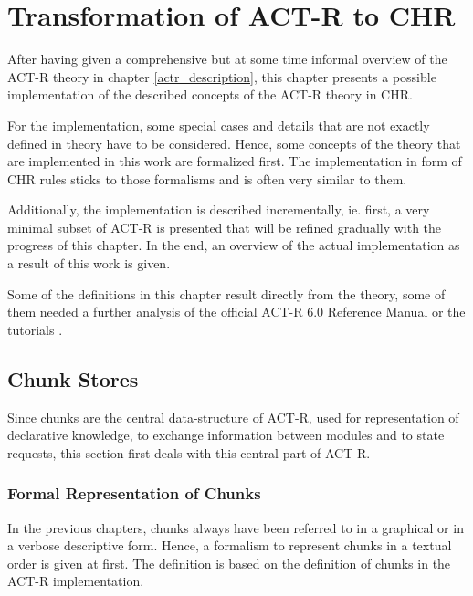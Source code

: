 \chapter{Transformation of ACT-R to CHR}

After having given a comprehensive but at some time informal overview of the ACT-R theory in chapter \ref{actr_description}, this chapter presents a possible implementation of the described concepts of the ACT-R theory in CHR.

For the implementation, some special cases and details that are not exactly defined in theory have to be considered. Hence, some concepts of the theory that are implemented in this work are formalized first. The implementation in form of CHR rules sticks to those formalisms and is often very similar to them.

Additionally, the implementation is described incrementally, ie. first, a very minimal subset of ACT-R is presented that will be refined gradually with the progress of this chapter. In the end, an overview of the actual implementation as a result of this work is given.

Some of the definitions in this chapter result directly from the theory, some of them needed a further analysis of the official ACT-R 6.0 Reference Manual \cite{actr_reference} or the tutorials \cite{actr_tutorial}. 

\section{Chunk Stores}

Since chunks are the central data-structure of ACT-R, used for representation of declarative knowledge, to exchange information between modules and to state requests, this section first deals with this central part of ACT-R.

\subsection{Formal Representation of Chunks}

In the previous chapters, chunks always have been referred to in a graphical or in a verbose descriptive form. Hence, a formalism to represent chunks in a textual order is given at first. The definition is based on the definition of chunks in the ACT-R implementation.

